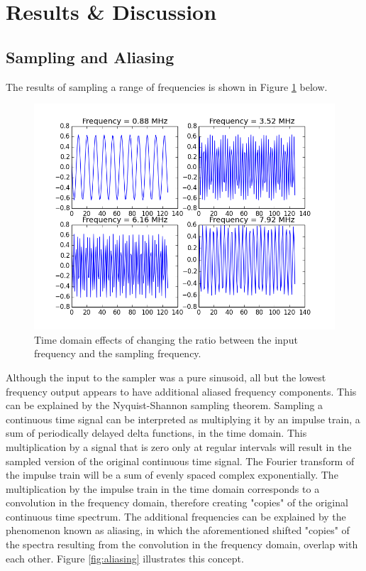 \documentclass{article}
\begin{document}

\section{Results \& Discussion}
  \subsection{Sampling and Aliasing}
  The results of sampling a range of frequencies is shown in Figure \ref{fig:sampling_time}  below.
  
\begin{figure}[h!]
\centering
\includegraphics[scale=0.7]{sampling_time.png}
\caption{Time domain effects of changing the ratio between the input frequency and the sampling frequency.}
\label{fig:sampling_time}
\end{figure}

Although the input to the sampler was a pure sinusoid, all but the lowest frequency output appears to have additional aliased frequency components.  This can be explained by the Nyquist-Shannon sampling theorem.  Sampling a continuous time signal can be interpreted as multiplying it by an impulse train, a sum of periodically delayed delta functions, in the time domain.  This multiplication by a signal that is zero only at regular intervals will result in the sampled version of the original continuous time signal. The Fourier transform of the impulse train will be a sum of evenly spaced complex exponentially. The multiplication by the impulse train in the time domain corresponds to a convolution in the frequency domain, therefore creating "copies" of the original continuous time spectrum.
    The additional frequencies can be explained by the phenomenon known as aliasing, in which the aforementioned shifted "copies" of the spectra resulting from the convolution in the frequency domain, overlap with each other. Figure \ref{fig:aliasing} illustrates this concept. 
    
\end{document}
